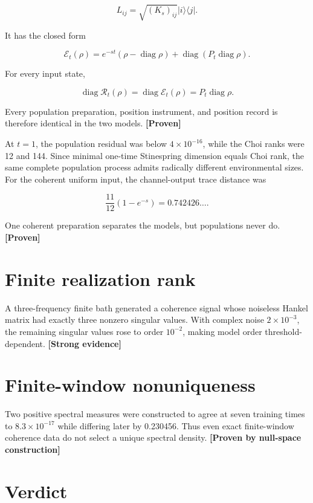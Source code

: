 \documentclass[11pt,a4paper,openany]{report}
\newcommand{\statusProven}{\textcolor{fingreen}{[Proven]}}
\newcommand{\statusStrong}{\textcolor{finblue}{[Strong evidence]}}
\begin{document}
\[
L_{ij}=\sqrt{(K_s)_{ij}}|i\rangle\langle j|.
\]

It has the closed form

\[
\mathcal E_t(\rho)
=e^{-st}(\rho-\operatorname{diag}\rho)
+\operatorname{diag}(P_t\operatorname{diag}\rho).
\]

For every input state,

\[
\operatorname{diag}\mathcal R_t(\rho)
=\operatorname{diag}\mathcal E_t(\rho)
=P_t\operatorname{diag}\rho.
\]

Every population preparation, position instrument, and position record is therefore identical in the two models. \textbf{\statusProven{}}

At \(t=1\), the population residual was below \(4\times10^{-16}\), while the Choi ranks were 12 and 144. Since minimal one-time Stinespring dimension equals Choi rank, the same complete population process admits radically different environmental sizes. For the coherent uniform input, the channel-output trace distance was

\[
\frac{11}{12}(1-e^{-s})=0.742426\ldots .
\]

One coherent preparation separates the models, but populations never do. \textbf{\statusProven{}}

\section{Finite realization rank}

A three-frequency finite bath generated a coherence signal whose noiseless Hankel matrix had exactly three nonzero singular values. With complex noise \(2\times10^{-3}\), the remaining singular values rose to order \(10^{-2}\), making model order threshold-dependent. \textbf{\statusStrong{}}

\section{Finite-window nonuniqueness}

Two positive spectral measures were constructed to agree at seven training times to \(8.3\times10^{-17}\) while differing later by 0.230456. Thus even exact finite-window coherence data do not select a unique spectral density. \textbf{[Proven by null-space construction]}

\section{Verdict}
\end{document}
